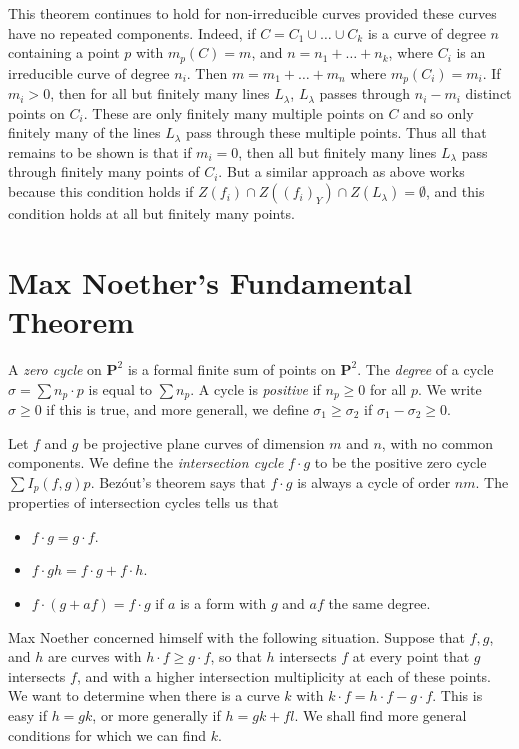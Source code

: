 \begin{remark}
    This theorem continues to hold for non-irreducible curves provided these curves have no repeated components. Indeed, if $C = C_1 \cup \dots \cup C_k$ is a curve of degree $n$ containing a point $p$ with $m_p(C) = m$, and $n = n_1 + \dots + n_k$, where $C_i$ is an irreducible curve of degree $n_i$. Then $m = m_1 + \dots + m_n$ where $m_p(C_i) = m_i$. If $m_i > 0$, then for all but finitely many lines $L_\lambda$, $L_\lambda$ passes through $n_i - m_i$ distinct points on $C_i$. These are only finitely many multiple points on $C$ and so only finitely many of the lines $L_\lambda$ pass through these multiple points. Thus all that remains to be shown is that if $m_i = 0$, then all but finitely many lines $L_\lambda$ pass through finitely many points of $C_i$. But a similar approach as above works because this condition holds if $Z(f_i) \cap Z((f_i)_Y) \cap Z(L_\lambda) = \emptyset$, and this condition holds at all but finitely many points.
\end{remark}

\section{Max Noether's Fundamental Theorem}

A \emph{zero cycle} on $\mathbf{P}^2$ is a formal finite sum of points on $\mathbf{P}^2$. The \emph{degree} of a cycle $\sigma = \sum n_p \cdot p$ is equal to $\sum n_p$. A cycle is \emph{positive} if $n_p \geq 0$ for all $p$. We write $\sigma \geq 0$ if this is true, and more generall, we define $\sigma_1 \geq \sigma_2$ if $\sigma_1 - \sigma_2 \geq 0$.

Let $f$ and $g$ be projective plane curves of dimension $m$ and $n$, with no common components. We define the \emph{intersection cycle} $f \cdot g$ to be the positive zero cycle $\sum I_p(f,g) p$. Bez\'{o}ut's theorem says that $f \cdot g$ is always a cycle of order $nm$. The properties of intersection cycles tells us that
%
\begin{itemize}
    \item $f \cdot g = g \cdot f$.
    \item $f \cdot gh = f \cdot g + f \cdot h$.
    \item $f \cdot (g + af) = f \cdot g$ if $a$ is a form with $g$ and $af$ the same degree.
\end{itemize}
%
Max Noether concerned himself with the following situation. Suppose that $f,g$, and $h$ are curves with $h \cdot f \geq g \cdot f$, so that $h$ intersects $f$ at every point that $g$ intersects $f$, and with a higher intersection multiplicity at each of these points. We want to determine when there is a curve $k$ with $k \cdot f = h \cdot f - g \cdot f$. This is easy if $h = gk$, or more generally if $h = gk + fl$. We shall find more general conditions for which we can find $k$.

